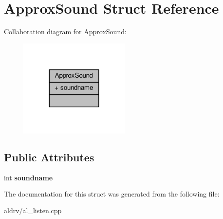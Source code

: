 \hypertarget{structApproxSound}{}\section{Approx\+Sound Struct Reference}
\label{structApproxSound}


Collaboration diagram for Approx\+Sound\+:
\nopagebreak
\begin{figure}[H]
\begin{center}
\leavevmode
\includegraphics[width=156pt]{d6/d3d/structApproxSound__coll__graph}
\end{center}
\end{figure}
\subsection*{Public Attributes}
\begin{DoxyCompactItemize}
\item 
int {\bfseries soundname}\hypertarget{structApproxSound_a8c49bbcc49f1f5f6aba3b345ab16e343}{}\label{structApproxSound_a8c49bbcc49f1f5f6aba3b345ab16e343}

\end{DoxyCompactItemize}


The documentation for this struct was generated from the following file\+:\begin{DoxyCompactItemize}
\item 
aldrv/al\+\_\+listen.\+cpp\end{DoxyCompactItemize}
